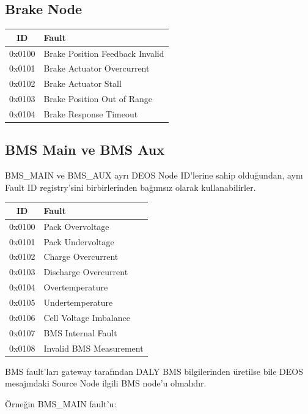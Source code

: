 \documentclass[a4paper,11pt]{article}
\begin{document}
\subsection{Brake Node}

\begin{center}
\begin{tabular}{c l}
\toprule
\textbf{ID} & \textbf{Fault} \\
\midrule
0x0100 & Brake Position Feedback Invalid \\
0x0101 & Brake Actuator Overcurrent \\
0x0102 & Brake Actuator Stall \\
0x0103 & Brake Position Out of Range \\
0x0104 & Brake Response Timeout \\
\bottomrule
\end{tabular}
\end{center}

\subsection{BMS Main ve BMS Aux}

BMS_MAIN ve BMS_AUX ayrı DEOS Node ID'lerine sahip olduğundan,
aynı Fault ID registry'sini birbirlerinden bağımsız olarak
kullanabilirler.

\begin{center}
\begin{tabular}{c l}
\toprule
\textbf{ID} & \textbf{Fault} \\
\midrule
0x0100 & Pack Overvoltage \\
0x0101 & Pack Undervoltage \\
0x0102 & Charge Overcurrent \\
0x0103 & Discharge Overcurrent \\
0x0104 & Overtemperature \\
0x0105 & Undertemperature \\
0x0106 & Cell Voltage Imbalance \\
0x0107 & BMS Internal Fault \\
0x0108 & Invalid BMS Measurement \\
\bottomrule
\end{tabular}
\end{center}

BMS fault'ları gateway tarafından DALY BMS bilgilerinden üretilse
bile DEOS mesajındaki Source Node ilgili BMS node'u olmalıdır.

Örneğin BMS_MAIN fault'u:
\end{document}
